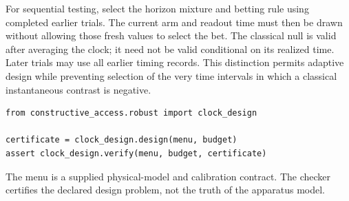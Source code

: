 For sequential testing, select the horizon mixture and betting rule using
completed earlier trials. The current arm and readout time must then be
drawn without allowing those fresh values to select the bet. The classical
null is valid after averaging the clock; it need not be valid conditional on
its realized time. Later trials may use all earlier timing records. This
distinction permits adaptive design while preventing selection of the very
time intervals in which a classical instantaneous contrast is negative.

\begin{verbatim}
from constructive_access.robust import clock_design

certificate = clock_design.design(menu, budget)
assert clock_design.verify(menu, budget, certificate)
\end{verbatim}
The menu is a supplied physical-model and calibration contract. The checker
certifies the declared design problem, not the truth of the apparatus model.

